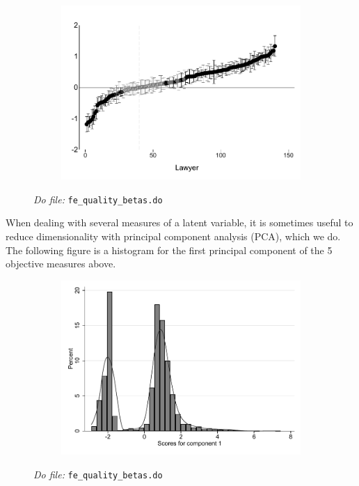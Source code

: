 \documentclass[oneside,11pt]{article}
\begin{document}
\begin{figure}[H]
\begin{center}
\begin{subfigure}{0.49\textwidth}
        \includegraphics[width=\textwidth]{Figuras/betas_ql_settlement.pdf}
    \end{subfigure}        
    \end{center}
    \scriptsize{ \noindent 
    \textit{Do file: }  \texttt{fe\_quality\_betas.do}}

\end{figure}

When dealing with several measures of a latent variable, it is sometimes useful to reduce dimensionality with principal component analysis (PCA), which we do. The following figure is a histogram for the first principal component of the 5 objective measures above.




\begin{figure}[H] 
    \label{pca_hist}
    \caption{Histogram of PCA}
     \begin{center}
      \begin{subfigure}{0.75\textwidth}
        \centering
        \includegraphics[width=\textwidth]{Figuras/hist_pca.pdf}
    \end{subfigure}
    \end{center}
    \scriptsize{ \noindent 
    \textit{Do file: }  \texttt{fe\_quality\_betas.do}}

\end{figure}
\end{document}
